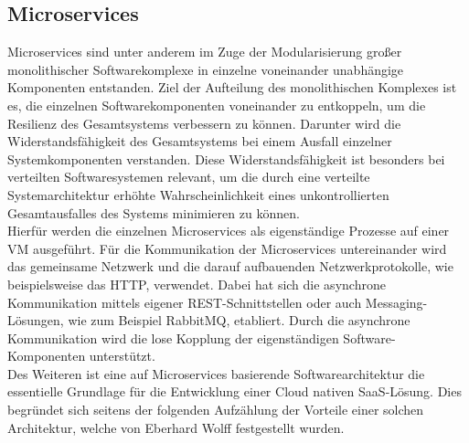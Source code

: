 \subsection{Microservices}
Microservices sind unter anderem im Zuge der Modularisierung großer monolithischer Softwarekomplexe in einzelne voneinander unabhängige Komponenten entstanden. Ziel der Aufteilung des monolithischen Komplexes ist es, die einzelnen Softwarekomponenten voneinander zu entkoppeln, um die Resilienz des Gesamtsystems verbessern zu können. Darunter wird die Widerstandsfähigkeit des Gesamtsystems bei einem Ausfall einzelner Systemkomponenten verstanden. Diese Widerstandsfähigkeit ist besonders bei verteilten Softwaresystemen relevant, um die durch eine verteilte Systemarchitektur erhöhte Wahrscheinlichkeit eines unkontrollierten Gesamtausfalles des Systems minimieren zu können.\autocite[Vgl.][S. 1-2]{Wagner.2016}\\
Hierfür werden die einzelnen Microservices als eigenständige Prozesse auf einer \ac{VM} ausgeführt. Für die Kommunikation der Microservices untereinander wird das gemeinsame Netzwerk und die darauf aufbauenden Netzwerkprotokolle, wie beispielsweise das \ac{HTTP}, verwendet. Dabei hat sich die asynchrone Kommunikation mittels eigener \ac{REST}-Schnittstellen oder auch Messaging-Lösungen, wie zum Beispiel RabbitMQ, etabliert. Durch die asynchrone Kommunikation wird die lose Kopplung der eigenständigen Software-Komponenten unterstützt.\autocite[Vgl.][S. 1-2, 64-65]{Wolff.2016} \\
Des Weiteren ist eine auf Microservices basierende Softwarearchitektur die essentielle Grundlage für die Entwicklung einer Cloud nativen \ac{SaaS}-Lösung. Dies begründet sich seitens der folgenden Aufzählung der Vorteile einer solchen Architektur, welche von Eberhard Wolff festgestellt wurden.
